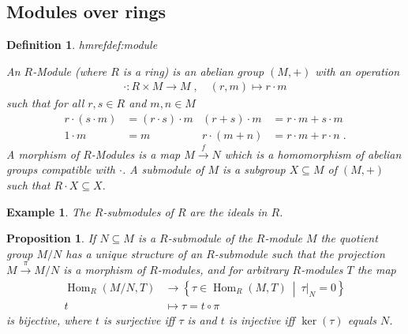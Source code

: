 \documentclass[DIV=14,parskip=full,pointednumbers]{scrartcl}
\theoremstyle{cthm}
\newtheorem{prop}{Proposition}[subsection]
\theoremstyle{cdef}
\newtheorem{defi}{Definition}[subsection]
\newtheorem{example}{Example}[subsection]
\newcommand{\lbl}[1]{
	\label{#1}
	\edef\dummy{\curthm}
	\expandafter\xdef\csname thmref#1\endcsname{\dummy}
}
\newcommand{\Hom}{\operatorname{Hom}}
\newcommand{\longto}{\longrightarrow}
\newcommand{\st}{\ \middle|\ }
\begin{document}
\subsection{Modules over rings}
\begin{defi}\lbl{def:module}
 An $R$-Module (where $R$ is a ring) is an abelian group $(M,+)$ with an operation
 \begin{align*}
  \cdot: R\times M \longto M\;,\quad  (r,m) \longmapsto r\cdot m
 \end{align*}
 such that for all $r,s\in R$ and $m,n\in M$
 \begin{align*}
  r\cdot(s\cdot m) &= (r\cdot s)\cdot m & (r+s)\cdot m &= r\cdot m + s\cdot m\\
  1\cdot m &= m & r\cdot(m+n)&= r\cdot m +r\cdot n\;. 
 \end{align*}
A \emph{morphism} of $R$-Modules is a map $M \overset{f}{\longto} N$ which is a homomorphism of abelian groups compatible with $\cdot$.
A \emph{submodule} of $M$ is a subgroup $X\subseteq M$ of $(M,+)$ such that $R\cdot X \subseteq X$. 
\end{defi}
\begin{example} The $R$-submodules of $R$ are the ideals in $R$.
\end{example}
\begin{prop} If $N\subseteq M$ is a $R$-submodule of the $R$-module $M$ the quotient group $M/N$ has a unique structure of an $R$-submodule such that the projection $M\overset{\pi}{\longto} M/N$ is a morphism of $R$-modules, and for arbitrary $R$-modules $T$ the map  
\begin{align*}
 \Hom_R(M/N, T) &\longto \left\{\tau\in \Hom_R(M,T)\st \tau|_N = 0\right\}\\
 t &\longmapsto \tau = t \circ \pi
\end{align*}
is bijective, where $t$ is surjective iff $\tau$ is and $t$ is injective iff $\ker(\tau)$ equals $N$.
\end{prop}
\end{document}
